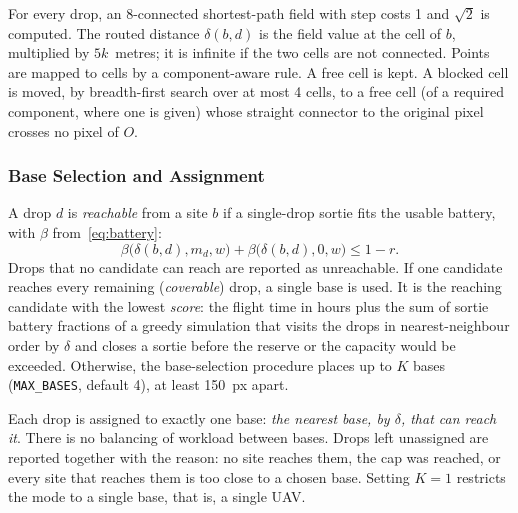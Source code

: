For every drop, an 8-connected shortest-path field with step costs 1 and $\sqrt2$ is computed. The routed distance $\delta(b,d)$ is the field value at the cell of $b$, multiplied by $5k$~metres; it is infinite if the two cells are not connected. Points are mapped to cells by a component-aware rule. A free cell is kept. A blocked cell is moved, by breadth-first search over at most 4 cells, to a free cell (of a required component, where one is given) whose straight connector to the original pixel crosses no pixel of $O$.

\subsubsection{Base Selection and Assignment}
A drop $d$ is \emph{reachable} from a site $b$ if a single-drop sortie fits the usable battery, with $\beta$ from~\eqref{eq:battery}:
\begin{equation}
\beta\big(\delta(b,d),m_d,w\big)+\beta\big(\delta(b,d),0,w\big)\le1-r .
\label{eq:reach}
\end{equation}
Drops that no candidate can reach are reported as unreachable. If one candidate reaches every remaining (\emph{coverable}) drop, a single base is used. It is the reaching candidate with the lowest \emph{score}: the flight time in hours plus the sum of sortie battery fractions of a greedy simulation that visits the drops in nearest-neighbour order by $\delta$ and closes a sortie before the reserve or the capacity would be exceeded. Otherwise, the base-selection procedure places up to $K$ bases (\texttt{MAX\_BASES}, default 4), at least 150~px apart.

Each drop is assigned to exactly one base: \emph{the nearest base, by $\delta$, that can reach it}. There is no balancing of workload between bases. Drops left unassigned are reported together with the reason: no site reaches them, the cap was reached, or every site that reaches them is too close to a chosen base. Setting $K=1$ restricts the mode to a single base, that is, a single UAV.



